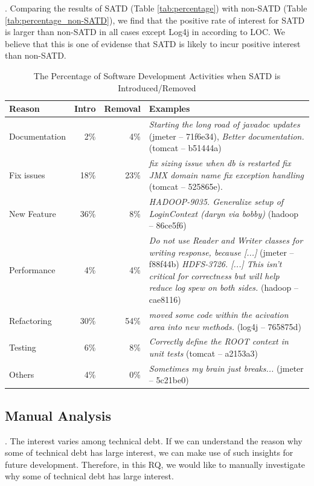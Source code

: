 \documentclass[review]{elsarticle}
\newcommand{\smallsection}[1]{\vspace{1mm}\noindent {\bf #1}.\hspace{2mm}}
\begin{document}
\smallsection{Result}
Comparing the results of SATD (Table \ref{tab:percentage}) with non-SATD (Table \ref{tab:percentage_non-SATD}), we find that the positive rate of interest for SATD is larger than non-SATD in all cases except Log4j in according to LOC. We believe that this is one of evidense that SATD is likely to incur positive interest than non-SATD.

\begin{table}[t]
  \caption{The Percentage of Software Development Activities when SATD is Introduced/Removed}
  \label{tab:percentage_activities} 
  \centering

  \begin{tabular}{l|r|r|p{2.80in}}
  \hline
       \textbf{Reason} & \textbf{Intro} & \textbf{Removal} & \textbf{Examples} \\
  \hline
  Documentation & 2\%  &   4\% &  \textit{Starting the long road of javadoc updates} (jmeter -- 71f6e34), \textit{Better documentation.} (tomcat -- b51444a) \\
  Fix issues  &  18\%  &  23\% &  \textit{fix sizing issue when db is restarted fix JMX domain name fix exception handling} (tomcat -- 525865e). \\
  New Feature &  36\%  &   8\% &  \textit{HADOOP-9035. Generalize setup of LoginContext (daryn via bobby)} (hadoop -- 86ce5f6) \\
  Performance &   4\%  &   4\% &  \textit{Do not use Reader and Writer classes for writing response, because [...]} (jmeter -- f88f44b) \textit{HDFS-3726. [...] This isn't critical for correctness but will help reduce log spew on both sides.} (hadoop -- cae8116) \\ 
  Refactoring &  30\%  &  54\% &  \textit{moved some code within the acivation area into new methods.} (log4j -- 765875d) \\
  Testing     &   6\%  &   8\% &  \textit{Correctly define the ROOT context in unit tests} (tomcat -- a2153a3) \\
  Others      &   4\%  &   0\% &  \textit{Sometimes my brain just breaks...} (jmeter -- 5c21be0) \\
  \hline
  \end{tabular}
\end{table}

\subsection{Manual Analysis}
\smallsection{Motivation}
The interest varies among technical debt. If we can understand the reason why some of technical debt has large interest, we can make use of such insights for future development. Therefore, in this RQ, we would like to manually investigate why some of technical debt has large interest.
\end{document}

